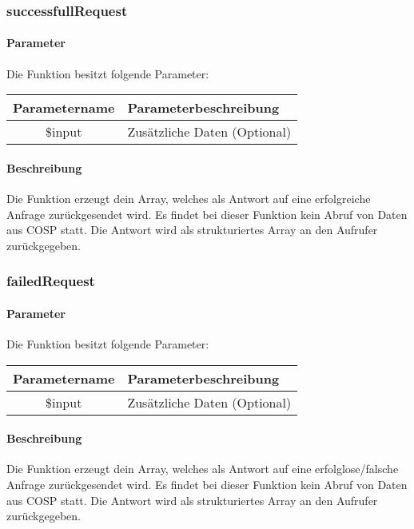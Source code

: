 \subsubsection{successfullRequest}
\paragraph{Parameter} Die Funktion besitzt folgende Parameter:
\begin{table}[H]
	\begin{tabular}{|c|p{11cm}|}
		\hline
		\textbf{Parametername} & \textbf{Parameterbeschreibung} \\ \hline
		\$input & Zusätzliche Daten (Optional)\\ \hline
	\end{tabular}
\end{table}
\paragraph{Beschreibung} Die Funktion erzeugt dein Array, welches als Antwort auf eine erfolgreiche Anfrage zurückgesendet wird. Es findet bei dieser Funktion kein Abruf von Daten aus {\glqq COSP\grqq} statt. Die Antwort wird als strukturiertes Array an den Aufrufer zurückgegeben.
\subsubsection{failedRequest}
\paragraph{Parameter} Die Funktion besitzt folgende Parameter:
\begin{table}[H]
	\begin{tabular}{|c|p{11cm}|}
		\hline
		\textbf{Parametername} & \textbf{Parameterbeschreibung} \\ \hline
		\$input & Zusätzliche Daten (Optional)\\ \hline
	\end{tabular}
\end{table}
\paragraph{Beschreibung} Die Funktion erzeugt dein Array, welches als Antwort auf eine erfolglose/falsche Anfrage zurückgesendet wird. Es findet bei dieser Funktion kein Abruf von Daten aus {\glqq COSP\grqq} statt. Die Antwort wird als strukturiertes Array an den Aufrufer zurückgegeben.
